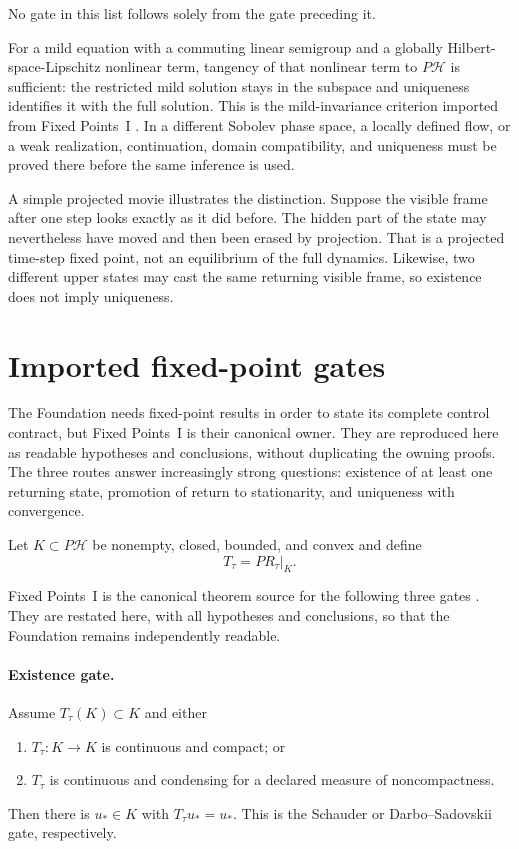 \documentclass[11pt]{article}
\begin{document}
No gate in this list follows solely from the gate preceding it.

For a mild equation with a commuting linear semigroup and a globally
Hilbert-space-Lipschitz nonlinear term, tangency of that nonlinear term
to $P\mathcal H$ is sufficient: the restricted mild solution stays in the
subspace and uniqueness identifies it with the full solution. This is the
mild-invariance criterion imported from Fixed Points~I \cite{FixedPoints}.
In a different Sobolev phase space, a locally defined flow, or a weak
realization, continuation, domain compatibility, and uniqueness must be
proved there before the same inference is used.

A simple projected movie illustrates the distinction. Suppose the visible
frame after one step looks exactly as it did before. The hidden part of the
state may nevertheless have moved and then been erased by projection. That is
a projected time-step fixed point, not an equilibrium of the full dynamics.
Likewise, two different upper states may cast the same returning visible
frame, so existence does not imply uniqueness.

\section{Imported fixed-point gates}

The Foundation needs fixed-point results in order to state its complete
control contract, but Fixed Points~I is their canonical owner. They are
reproduced here as readable hypotheses and conclusions, without duplicating
the owning proofs. The three routes answer increasingly strong questions:
existence of at least one returning state, promotion of return to stationarity,
and uniqueness with convergence.

Let $K\subset P\mathcal H$ be nonempty, closed, bounded, and convex and define
\[
 T_\tau=P R_\tau|_K.
\]

Fixed Points~I is the canonical theorem source for the following three gates
\cite{FixedPoints}. They are restated here, with all hypotheses and
conclusions, so that the Foundation remains independently readable.

\paragraph{Existence gate.}
Assume $T_\tau(K)\subset K$ and either
\begin{enumerate}
\item $T_\tau:K\to K$ is continuous and compact; or
\item $T_\tau$ is continuous and condensing for a declared measure of
noncompactness.
\end{enumerate}
Then there is $u_\ast\in K$ with $T_\tau u_\ast=u_\ast$.
This is the Schauder or Darbo--Sadovskii gate, respectively.
\end{document}
